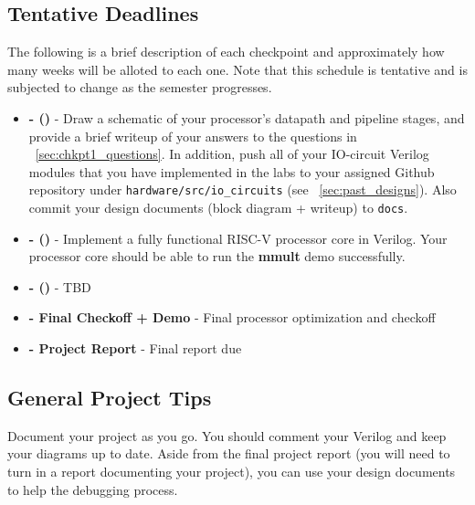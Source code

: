 \documentclass[11pt]{article}
\begin{document}
\subsection{Tentative Deadlines}
\label{tentative_deadlines}
The following is a brief description of each checkpoint and approximately how many weeks will be alloted to each one. Note that this schedule is tentative and is subjected to change as the semester progresses.


\begin{itemize}
  \item \textbf{\blockDiagramDueDate \space - \blockDiagramTaskName \space (\blockDiagramTimeAlloted)} - Draw a schematic of your processor's datapath and pipeline stages, and provide a brief writeup of your answers to the questions in ~\ref{sec:chkpt1_questions}. In addition, push all of your IO-circuit Verilog modules that you have implemented in the labs to your assigned Github repository under \verb|hardware/src/io_circuits| (see ~\ref{sec:past_designs}). Also commit your design documents (block diagram + writeup) to \verb|docs|.
  \item \textbf{\baseCPUDueDate \space - \baseCPUTaskName \space (\baseCPUTimeAlloted)} - Implement a fully functional RISC-V processor core in Verilog. Your processor core should be able to run the \textbf{mmult} demo successfully.
  \item \textbf{\imageDueDate \space - \imageTaskName \space (\imageTimeAlloted)} - TBD
  \item \textbf{\finalCheckoffDueDate \space - Final Checkoff + Demo} - Final processor optimization and checkoff
  \item \textbf{\finalReportDueDate \space - Project Report} - Final report due
\end{itemize}

\subsection{General Project Tips}
\label{tips}
Document your project as you go.
You should comment your Verilog and keep your diagrams up to date.
Aside from the final project report (you will need to turn in a report documenting your project), you can use your design documents to help the debugging process.
\end{document}
